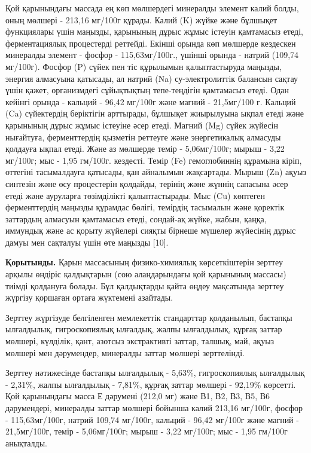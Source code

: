 Қой қарынындағы массада ең көп мөлшердегі минералды элемент калий болды,
оның мөлшері - 213,16 мг/100г құрады. Калий (K) жүйке және бұлшықет
функциялары үшін маңызды, қарынының дұрыс жұмыс істеуін қамтамасыз
етеді, ферментациялық процестерді реттейді. Екінші орында көп мөлшерде
кездескен минералды элемент - фосфор - 115,63мг/100г., үшінші орында -
натрий (109,74 мг/100г). Фосфор (P) сүйек пен тіс құрылымын
қалыптастыруда маңызды, энергия алмасуына қатысады, ал натрий (Na)
су-электролиттік балансын сақтау үшін қажет, организмдегі сұйықтықтың
тепе-теңдігін қамтамасыз етеді. Одан кейінгі орында - кальций - 96,42
мг/100г және магний - 21,5мг/100 г. Кальций (Ca) сүйектердің беріктігін
арттырады, бұлшықет жиырылуына ықпал етеді және қарынының дұрыс жұмыс
істеуіне әсер етеді. Магний (Mg) сүйек жүйесін нығайтуға, ферменттердің
қызметін реттеуге және энергетикалық алмасуды қолдауға ықпал етеді. Және
аз мөлшерде темір - 5,06мг/100г; мырыш - 3,22 мг/100г; мыс - 1,95
гм/100г. кездесті. Темір (Fe) гемоглобиннің құрамына кіріп, оттегіні
тасымалдауға қатысады, қан айналымын жақсартады. Мырыш (Zn) ақуыз
синтезін және өсу процестерін қолдайды, терінің және жүннің сапасына
әсер етеді және ауруларға төзімділікті қалыптастырады. Мыс (Cu) көптеген
ферменттердің маңызды құрамдас бөлігі, темірдің тасымалын және қоректік
заттардың алмасуын қамтамасыз етеді, сондай-ақ жүйке, жабын, қаңқа,
иммундық және ас қорыту жүйелері сияқты бірнеше мүшелер жүйесінің дұрыс
дамуы мен сақталуы үшін өте маңызды {[}10{]}.

{\bfseries Қорытынды.} Қарын массасының физико-химиялық көрсеткіштерін
зерттеу арқылы өндіріс қалдықтарын (сою алаңдарындағы қой қарынының
массасы) тиімді қолдануға болады. Бұл қалдықтарды қайта өңдеу мақсатында
зерттеу жүргізу қоршаған ортаға жүктемені азайтады.

Зерттеу жүргізуде белгіленген мемлекеттік стандарттар қолданылып,
бастапқы ылғалдылық, гигроскопиялық ылғалдық, жалпы ылғалдылық, құрғақ
заттар мөлшері, күлділік, қант, азотсыз экстрактивті заттар, талшық,
май, ақуыз мөлшері мен дәрумендер, минералды заттар мөлшері зерттелінді.

Зерттеу нәтижесінде бастапқы ылғалдылық - 5,63\%, гигроскопиялық
ылғалдылық - 2,31\%, жалпы ылғалдылық - 7,81\%, құрғақ заттар мөлшері -
92,19\% көрсетті. Қой қарынындағы масса Е дәрумені (212,0 мг) және В1,
В2, В3, В5, В6 дәрумендері, минералды заттар мөлшері бойынша калий
213,16 мг/100г, фосфор - 115,63мг/100г, натрий 109,74 мг/100г, кальций -
96,42 мг/100г және магний - 21,5мг/100г, темір - 5,06мг/100г; мырыш -
3,22 мг/100г; мыс - 1,95 гм/100г анықталды.

